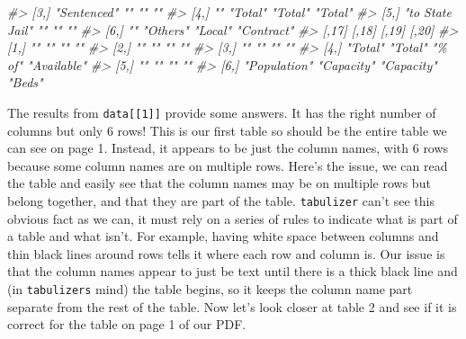 \documentclass[
]{krantz}
\makeatletter
\newenvironment{Shaded}{\begin{snugshade}}{\end{snugshade}}
\newcommand{\CommentTok}[1]{\textcolor[rgb]{0.37,0.37,0.37}{\textit{#1}}}
\newenvironment{kframe}{%
\medskip{}
\setlength{\fboxsep}{.8em}
 \def\at@end@of@kframe{}%
 \ifinner\ifhmode%
  \def\at@end@of@kframe{\end{minipage}}%
  \begin{minipage}{\columnwidth}%
 \fi\fi%
 \def\FrameCommand##1{\hskip\@totalleftmargin \hskip-\fboxsep
 \colorbox{shadecolor}{##1}\hskip-\fboxsep
     \hskip-\linewidth \hskip-\@totalleftmargin \hskip\columnwidth}%
 \MakeFramed {\advance\hsize-\width
   \@totalleftmargin\z@ \linewidth\hsize
   \@setminipage}}%
 {\par\unskip\endMakeFramed%
 \at@end@of@kframe}
\renewenvironment{Shaded}{\begin{kframe}}{\end{kframe}}
\makeatother
\begin{document}
\begin{Shaded}
\begin{Highlighting}[]
\CommentTok{\#\textgreater{} [3,] "Sentenced"     ""       ""      ""        }
\CommentTok{\#\textgreater{} [4,] ""              "Total"  "Total" "Total"   }
\CommentTok{\#\textgreater{} [5,] "to State Jail" ""       ""      ""        }
\CommentTok{\#\textgreater{} [6,] ""              "Others" "Local" "Contract"}
\CommentTok{\#\textgreater{}      [,17]        [,18]      [,19]      [,20]      }
\CommentTok{\#\textgreater{} [1,] ""           ""         ""         ""         }
\CommentTok{\#\textgreater{} [2,] ""           ""         ""         ""         }
\CommentTok{\#\textgreater{} [3,] ""           ""         ""         ""         }
\CommentTok{\#\textgreater{} [4,] "Total"      "Total"    "\% of"     "Available"}
\CommentTok{\#\textgreater{} [5,] ""           ""         ""         ""         }
\CommentTok{\#\textgreater{} [6,] "Population" "Capacity" "Capacity" "Beds"}
\end{Highlighting}
\end{Shaded}

The results from \texttt{data{[}{[}1{]}{]}} provide some answers. It has the right number of columns but only 6 rows! This is our first table so should be the entire table we can see on page 1. Instead, it appears to be just the column names, with 6 rows because some column names are on multiple rows. Here's the issue, we can read the table and easily see that the column names may be on multiple rows but belong together, and that they are part of the table. \texttt{tabulizer} can't see this obvious fact as we can, it must rely on a series of rules to indicate what is part of a table and what isn't. For example, having white space between columns and thin black lines around rows tells it where each row and column is. Our issue is that the column names appear to just be text until there is a thick black line and (in \texttt{tabulizer\textquotesingle{}s} mind) the table begins, so it keeps the column name part separate from the rest of the table. Now let's look closer at table 2 and see if it is correct for the table on page 1 of our PDF.
\end{document}

